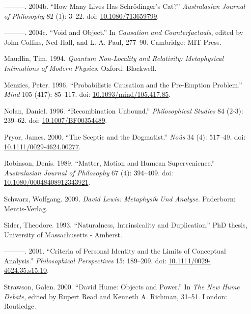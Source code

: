 \documentclass[
  11pt,
  letterpaper,
  DIV=11,
  numbers=noendperiod,
  twoside]{scrartcl}
\newlength{\cslhangindent}
\newenvironment{CSLReferences}[2] %
 {\begin{list}{}{%
  \setlength{\itemindent}{0pt}
  \setlength{\leftmargin}{0pt}
  \setlength{\parsep}{0pt}
  \ifodd #1
   \setlength{\leftmargin}{\cslhangindent}
   \setlength{\itemindent}{-1\cslhangindent}
  \fi
  \setlength{\itemsep}{#2\baselineskip}}}
 {\end{list}}
\begin{document}
\begin{CSLReferences}{1}{0}
---------. 2004b. {``How Many Lives Has {S}chrödinger's Cat?''}
\emph{Australasian Journal of Philosophy} 82 (1): 3--22. doi:
\href{https://doi.org/10.1080/713659799}{10.1080/713659799}.

---------. 2004c. {``Void and Object.''} In \emph{Causation and
Counterfactuals}, edited by John Collins, Ned Hall, and L. A. Paul,
277--90. Cambridge: {MIT} Press.

Maudlin, Tim. 1994. \emph{Quantum Non-Locality and Relativity:
Metaphysical Intimations of Modern Physics}. Oxford: Blackwell.

Menzies, Peter. 1996. {``Probabilistic Causation and the Pre-Emption
Problem.''} \emph{Mind} 105 (417): 85--117. doi:
\href{https://doi.org/10.1093/mind/105.417.85}{10.1093/mind/105.417.85}.

Nolan, Daniel. 1996. {``{Recombination Unbound}.''} \emph{Philosophical
Studies} 84 (2-3): 239--62. doi:
\href{https://doi.org/10.1007/BF00354489}{10.1007/BF00354489}.

Pryor, James. 2000. {``The Sceptic and the Dogmatist.''} \emph{No{û}s}
34 (4): 517--49. doi:
\href{https://doi.org/10.1111/0029-4624.00277}{10.1111/0029-4624.00277}.

Robinson, Denis. 1989. {``Matter, Motion and Humean Supervenience.''}
\emph{Australasian Journal of Philosophy} 67 (4): 394--409. doi:
\href{https://doi.org/10.1080/00048408912343921}{10.1080/00048408912343921}.

Schwarz, Wolfgang. 2009. \emph{David Lewis: Metaphysik Und Analyse}.
Paderborn: Mentis-Verlag.

Sider, Theodore. 1993. {``Naturalness, Intrinsicality and
Duplication.''} PhD thesis, University of Massachusetts - Amherst.

---------. 2001. {``Criteria of Personal Identity and the Limits of
Conceptual Analysis.''} \emph{Philosophical Perspectives} 15: 189--209.
doi:
\href{https://doi.org/10.1111/0029-4624.35.s15.10}{10.1111/0029-4624.35.s15.10}.

Strawson, Galen. 2000. {``David Hume: Objects and Power.''} In \emph{The
New Hume Debate}, edited by Rupert Read and Kenneth A. Richman, 31--51.
London: Routledge.


\end{CSLReferences}
\end{document}
